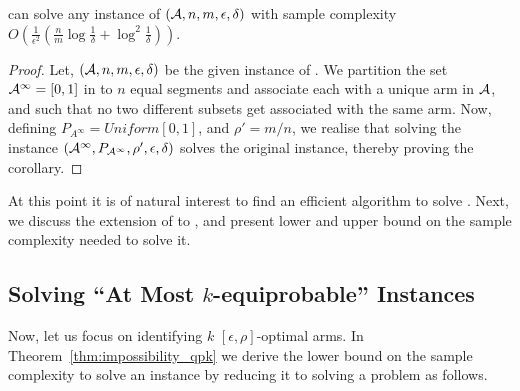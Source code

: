 \begin{corollary}
\label{cor:qffromqptighter}
\PPP can solve any instance of \QF $(\mathcal{A}, n, m, \epsilon, \delta)$ with sample complexity
$O\left(\frac{1}{\epsilon^2}\left(\frac{n}{m}\log\frac{1}{\delta} + \log^2\frac{1}{\delta}\right)\right)$.
\end{corollary}
\begin{proof}
Let, $(\mathcal{A}, n, m, \epsilon,\delta)$ be the given instance of \QF.
We partition the set $\mathcal{A}^\infty = [0,1]$ in to $n$ equal segments and associate each 
with a unique arm in $\mathcal{A}$, and such that no two different subsets get associated
with the same arm. Now, defining $P_{A^\infty} = Uniform[0,1]$, and $\rho' = m/n$,
we realise that solving the \QP instance $(\mathcal{A}^\infty, P_{\mathcal{A}^\infty}, \rho', \epsilon,\delta)$
solves the original \QF instance, thereby proving the corollary.
 \end{proof}

At this point it is of natural interest to find an efficient algorithm to solve \QPK.
Next, we discuss the extension of \QP to \QPK, and present lower and  upper bound 
on the sample complexity needed to solve it.


\subsection{Solving ``At Most $k$-equiprobable'' \protect\QPK Instances}
\label{subsec:tighterqpk}

Now, let us focus on identifying $k$ $[\epsilon, \rho]$-optimal arms.
In Theorem~\ref{thm:impossibility_qpk} we derive the lower bound on the sample complexity to solve an 
instance \QPK by reducing it to solving a \SUBSET problem as follows.


